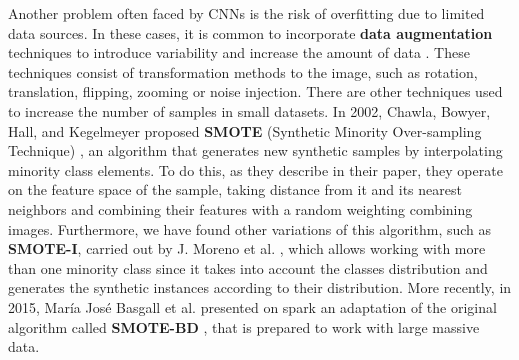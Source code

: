 Another problem often faced by CNNs is the risk of overfitting due to limited data sources. In these cases, it is common to incorporate \textbf{data augmentation} techniques to introduce variability and increase the amount of data \cite{shorten_survey_2019}. These techniques consist of transformation methods to the image, such as rotation, translation, flipping, zooming or noise injection. There are other techniques used to increase the number of samples in small datasets. In 2002, Chawla, Bowyer, Hall, and Kegelmeyer proposed \textbf{SMOTE} (Synthetic Minority Over-sampling Technique) \cite{chawla_smote_2002}, an algorithm that generates new synthetic samples by interpolating minority class elements. To do this, as they describe in their paper, they operate on the feature space of the sample, taking distance from it and its nearest neighbors and combining their features with a random weighting combining images. Furthermore, we have found other variations of this algorithm, such as \textbf{SMOTE-I}, carried out by J. Moreno et al. \cite{moreno_smote-i_2009}, which allows working with more than one minority class since it takes into account the classes distribution and generates the synthetic instances according to their distribution. More recently, in 2015, María José Basgall et al. presented on spark an adaptation of the original algorithm called \textbf{SMOTE-BD} \cite{basgall_smote-bd_2018}, that is prepared to work with large massive data.

